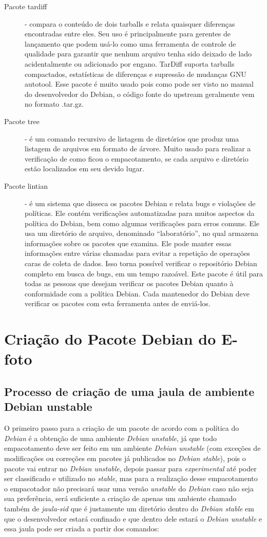 \begin{description}
	\item[Pacote tardiff] - compara o conteúdo de dois tarballs e relata quaisquer diferenças encontradas entre eles. Seu uso é principalmente para gerentes de lançamento que podem usá-lo como uma ferramenta de controle de qualidade para garantir que nenhum arquivo tenha sido deixado de lado acidentalmente ou adicionado por engano. TarDiff suporta tarballs compactados, estatísticas de diferenças e supressão de mudanças GNU autotool. Esse pacote é muito usado pois como pode ser visto no manual do desenvolvedor do Debian, o código fonte do upstream geralmente vem no formato .tar.gz.
	\item[Pacote tree] - é um comando recursivo de listagem de diretórios que produz uma listagem de arquivos em formato de árvore. Muito usado para realizar a verificação de como ficou o empacotamento, se cada arquivo e diretório estão localizados em seu devido lugar.
	\item[Pacote lintian] - é um sistema que disseca os pacotes Debian e relata bugs e violações de políticas. Ele contém verificações automatizadas para muitos aspectos da política do Debian, bem como algumas verificações para erros comuns. Ele usa um diretório de arquivo, denominado “laboratório”, no qual armazena informações sobre os pacotes que examina. Ele pode manter essas informações entre várias chamadas para evitar a repetição de operações caras de coleta de dados. Isso torna possível verificar o repositório Debian completo em busca de bugs, em um tempo razoável. Este pacote é útil para todas as pessoas que desejam verificar os pacotes Debian quanto à conformidade com a política Debian. Cada mantenedor do Debian deve verificar os pacotes com esta ferramenta antes de enviá-los.
\end{description}
 
\section{Criação do Pacote Debian do E-foto}

\subsection{Processo de criação de uma jaula de ambiente Debian unstable}

O primeiro passo para a criação de um pacote de acordo com a política do \textit{Debian} é a obtenção de uma ambiente \textit{Debian unstable}, já que todo empacotamento deve ser feito em um ambiente \textit{Debian unstable} (com exceções de modificações ou correções em pacotes já publicados no \textit{Debian stable}), pois o pacote vai entrar no \textit{Debian unstable}, depois passar para \textit{experimental} até poder ser classificado e utilizado no \textit{stable}, mas para a realização desse empacotamento o empacotador não precisará usar uma versão \textit{unstable} do \textit{Debian} caso não seja sua preferência, será suficiente a criação de apenas um ambiente chamado também de \textit{jaula-sid} que é justamente um diretório dentro do \textit{Debian stable} em que o desenvolvedor estará confinado e que dentro dele estará o \textit{Debian unstable} e essa jaula pode ser criada a partir dos comandos: 

